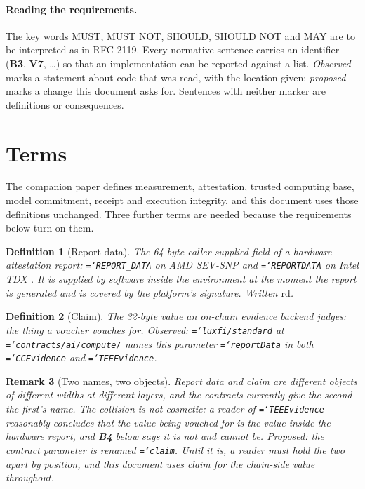 \documentclass[11pt,a4paper]{article}
\newtheorem{definition}{Definition}[section]
\newtheorem{remark}[definition]{Remark}
\newcommand{\code}[1]{\texttt{\hyphenchar\font=`\-\relax #1}}
\newcommand{\req}[1]{\textbf{#1}}
\begin{document}
\paragraph{Reading the requirements.} The key words MUST, MUST NOT, SHOULD, SHOULD
NOT and MAY are to be interpreted as in RFC 2119. Every normative sentence carries
an identifier (\req{B3}, \req{V7}, \ldots) so that an implementation can be
reported against a list. \emph{Observed} marks a statement about code that was
read, with the location given; \emph{proposed} marks a change this document asks
for. Sentences with neither marker are definitions or consequences.

\section{Terms}
\label{sec:terms}

The companion paper \cite{paper} defines measurement, attestation, trusted
computing base, model commitment, receipt and execution integrity, and this
document uses those definitions unchanged. Three further terms are needed because
the requirements below turn on them.

\begin{definition}[Report data]
The 64-byte caller-supplied field of a hardware attestation report: \code{REPORT\_DATA}
on AMD SEV-SNP \cite{snpabi} and \code{REPORTDATA} on Intel TDX \cite{tdx}. It is
supplied by software inside the environment at the moment the report is generated
and is covered by the platform's signature. Written $\mathrm{rd}$.
\end{definition}

\begin{definition}[Claim]
The 32-byte value an on-chain evidence backend judges: the thing a voucher vouches
for. Observed: \code{luxfi/standard} at \code{contracts/ai/compute/} names this
parameter \code{reportData} in both \code{CCEvidence} and \code{TEEEvidence}.
\end{definition}

\begin{remark}[Two names, two objects]
\label{rem:collision}
Report data and claim are different objects of different widths at different
layers, and the contracts currently give the second the first's name. The
collision is not cosmetic: a reader of \code{TEEEvidence} reasonably concludes
that the value being vouched for is the value inside the hardware report, and
\req{B4} below says it is not and cannot be. \emph{Proposed:} the contract
parameter is renamed \code{claim}. Until it is, a reader must hold the two apart
by position, and this document uses \emph{claim} for the chain-side value
throughout.
\end{remark}
\end{document}
